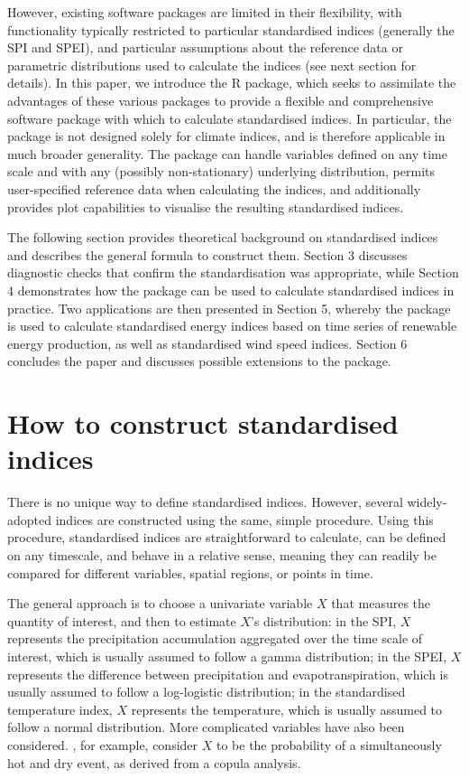However, existing software packages are limited in their flexibility, with functionality typically restricted to particular standardised indices (generally the SPI and SPEI), and particular assumptions about the reference data or parametric distributions used to calculate the indices (see next section for details). In this paper, we introduce the  R package, which seeks to assimilate the advantages of these various packages to provide a flexible and comprehensive software package with which to calculate standardised indices. In particular, the package is not designed solely for climate indices, and is therefore applicable in much broader generality. The package can handle variables defined on any time scale and with any (possibly non-stationary) underlying distribution, permits user-specified reference data when calculating the indices, and additionally provides plot capabilities to visualise the resulting standardised indices.

The following section provides theoretical background on standardised indices and describes the general formula to construct them. Section 3 discusses diagnostic checks that confirm the standardisation was appropriate, while Section 4 demonstrates how the  package can be used to calculate standardised indices in practice. Two applications are then presented in Section 5, whereby the  package is used to calculate standardised energy indices based on time series of renewable energy production, as well as standardised wind speed indices. Section 6 concludes the paper and discusses possible extensions to the package.

\section{How to construct standardised indices}\label{how-to-construct-standardised-indices}

There is no unique way to define standardised indices. However, several widely-adopted indices are constructed using the same, simple procedure. Using this procedure, standardised indices are straightforward to calculate, can be defined on any timescale, and behave in a relative sense, meaning they can readily be compared for different variables, spatial regions, or points in time.

The general approach is to choose a univariate variable \(X\) that measures the quantity of interest, and then to estimate \(X\)'s distribution: in the SPI, \(X\) represents the precipitation accumulation aggregated over the time scale of interest, which is usually assumed to follow a gamma distribution; in the SPEI, \(X\) represents the difference between precipitation and evapotranspiration, which is usually assumed to follow a log-logistic distribution; in the standardised temperature index, \(X\) represents the temperature, which is usually assumed to follow a normal distribution. More complicated variables have also been considered. \cite{HaoEtAl2019}, for example, consider \(X\) to be the probability of a simultaneously hot and dry event, as derived from a copula analysis.

